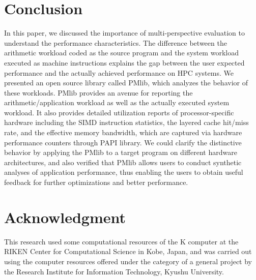 \documentclass[conference]{IEEEtran}
\begin{document}
\section{Conclusion}
In this paper, we discussed the importance of multi-perspective evaluation
to understand the performance characteristics. The difference between
the arithmetic workload coded as the source program and the system workload
executed as machine instructions explains the gap between the user expected
performance and the actually achieved performance on HPC systems.
We presented an open source library called PMlib, which analyzes the behavior
of these workloads.
PMlib provides an avenue for reporting the arithmetic/application workload
as well as the actually executed system workload.
It also provides detailed utilization reports of processor-specific hardware
including the SIMD instruction statistics, the layered cache
hit/miss rate, and the effective memory bandwidth,
which are captured via hardware performance counters through PAPI library.
We could clarify the distinctive behavior by applying the PMlib to a target
program on different hardware architectures, and also verified that PMlib
allows users to conduct synthetic analyses of application performance,
thus enabling the users to obtain useful feedback for further optimizations
and better performance.

\section*{Acknowledgment}
This research used some computational resources of the K computer at the RIKEN Center for Computational Science in Kobe, Japan, and was carried out using the computer resources offered under the category of a general project by the Research Institute for Information Technology, Kyushu University.


\end{document}
